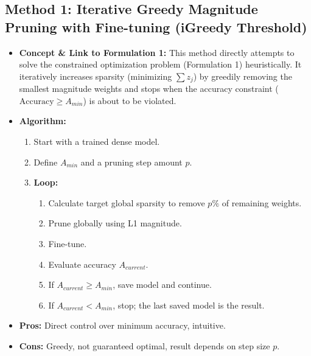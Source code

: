 \documentclass[10pt, article]{article} %
\begin{document}
\subsection{Method 1: Iterative Greedy Magnitude Pruning with Fine-tuning (iGreedy Threshold)}
\begin{itemize}
    \item \textbf{Concept \& Link to Formulation 1:} This method directly attempts to solve the constrained optimization problem (Formulation 1) heuristically. It iteratively increases sparsity (minimizing $\sum z_j$) by greedily removing the smallest magnitude weights and stops when the accuracy constraint ($\text{Accuracy} \ge A_{min}$) is about to be violated.
    \item \textbf{Algorithm:}
    \begin{enumerate} %
        \item Start with a trained dense model.
        \item Define $A_{min}$ and a pruning step amount $p$.
        \item \textbf{Loop:}
        \begin{enumerate} %
            \item Calculate target global sparsity to remove $p\%$ of remaining weights.
            \item Prune globally using L1 magnitude.
            \item Fine-tune.
            \item Evaluate accuracy $A_{current}$.
            \item If $A_{current} \ge A_{min}$, save model and continue.
            \item If $A_{current} < A_{min}$, stop; the last saved model is the result.
        \end{enumerate} %
    \end{enumerate} %
    \item \textbf{Pros:} Direct control over minimum accuracy, intuitive.
    \item \textbf{Cons:} Greedy, not guaranteed optimal, result depends on step size $p$.
\end{itemize}
\end{document}
